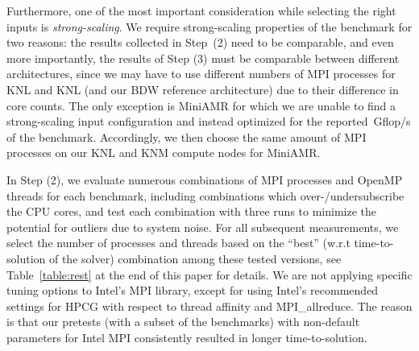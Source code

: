 %
Furthermore, one of the most important consideration while selecting the right inputs is
\textit{strong-scaling}. We require strong-scaling properties of the benchmark for two reasons:
the results collected in Step~(2) need to be comparable, and even more importantly, the results
of Step (3) must be comparable between different architectures, since we may have to use different
numbers of MPI processes for KNL and KNL (and our BDW reference architecture) due to their difference
in core counts. The only exception is MiniAMR for which we are unable to find a strong-scaling
input configuration and instead optimized for the reported~\unit[]{Gflop/s} of the benchmark.
Accordingly, we then choose the same amount of MPI processes on our KNL and KNM compute nodes for MiniAMR.

In Step (2), we evaluate numerous combinations of MPI processes and OpenMP threads
for each benchmark, including combinations which over-/undersubscribe the CPU cores, and test each
combination with three runs to minimize the potential for outliers due to system noise.
For all subsequent measurements, we select the number of processes and threads based on the ``best'' (w.r.t
time-to-solution of the solver) combination among these tested versions, see Table~\ref{table:rest} %
at the end of this paper for details.
We are not applying specific tuning options to Intel's MPI library, except for using Intel's recommended
settings for HPCG with respect to thread affinity and MPI\_allreduce. %
The reason is that our pretests (with a subset of the benchmarks) with non-default parameters for
Intel MPI consistently resulted in longer time-to-solution.

